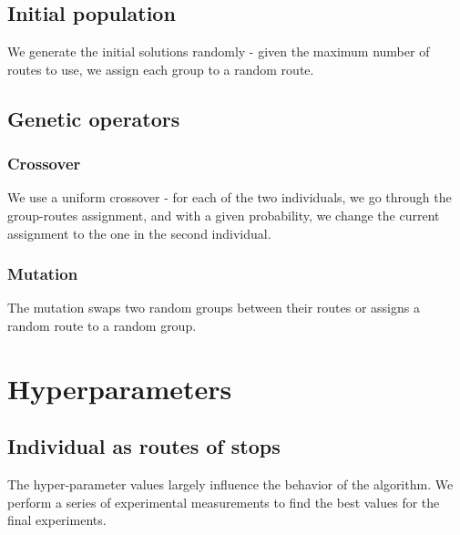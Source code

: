 \subsection{Initial population}

We generate the initial solutions randomly - given the maximum number of routes to use, we assign each group to a random route.

\subsection{Genetic operators}

\subsubsection{Crossover}

We use a uniform crossover - for each of the two individuals, we go through the group-routes assignment, and with a given probability, we change the current assignment to the one in the second individual.

\subsubsection{Mutation}

The mutation swaps two random groups between their routes or assigns a random route to a random group.

\section{Hyperparameters}\label{sec:genetic_hyperparams}

\subsection{Individual as routes of stops}

The hyper-parameter values largely influence the behavior of the algorithm. We perform a series of experimental measurements to find the best values for the final experiments.

